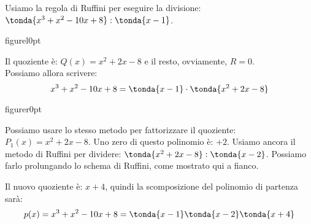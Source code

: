 Usiamo la regola di Ruffini per eseguire la divisione:
\(\tonda{x^{3}+x^{2}-10x+8} : \tonda{x-1}\).

\begin{wrapfloat}{figure}{l}{0pt}
% 
\scompruffiniaa
\end{wrapfloat}


Il quoziente è: \(Q(x)=x^{2}+2x-8\) e il resto, ovviamente, \(R=0\).\\
Possiamo allora scrivere:
\[x^3+x^2-10x+8=\tonda{x-1}\cdot \tonda{x^2+2x-8}\]

\begin{wrapfloat}{figure}{r}{0pt}
% 
\scompruffiniac
\end{wrapfloat}

Possiamo usare lo stesso metodo per fattorizzare il quoziente: 
\(P_1(x)=x^2+2x-8\). 
Uno zero di questo polinomio è: \(+2\). 
Usiamo ancora il metodo di Ruffini per dividere: 
\(\tonda{x^2+2x-8} : \tonda{x-2}\).
Possiamo farlo prolungando lo schema di Ruffini, come mostrato qui a fianco.

Il nuovo quoziente è: \(x+4\), quindi la scomposizione del polinomio di 
partenza sarà:
\[p(x)=x^{3}+x^{2}-10x+8 = \tonda{x-1} \tonda{x-2} \tonda{x+4}\]

\newpage %

